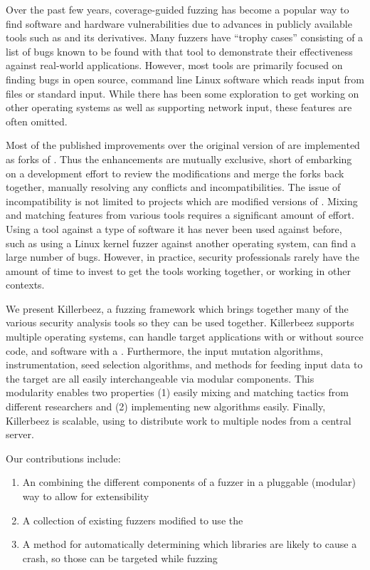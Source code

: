 Over the past few years, coverage-guided fuzzing has become a popular way to
find software and hardware vulnerabilities due to advances in publicly
available tools such as \AFL{}\cite{afl} and its derivatives.\cite{vanhauser} Many
fuzzers have ``trophy cases'' consisting of a list of bugs known to be found with that tool to
demonstrate their effectiveness against real-world applications.  However, most
tools are primarily focused on finding bugs in open source, command line Linux
software which reads input from files or standard input. While there has been some
exploration to get \AFL{} working on other operating
systems\cite{aflosx,winafl} as well as supporting network
input,\cite{netafl,preeny} these features are often omitted.

Most of the published improvements over the original version of \AFL{} are
implemented as forks of
\AFL{}.\cite{aflfast,aflgo,fairfuzz,perffuzz,pythia,collafl}
Thus the enhancements are mutually exclusive, short of embarking on a
development effort to review the modifications and merge the forks back
together, manually resolving any conflicts and incompatibilities.  The issue
of incompatibility is not limited to projects which are modified versions of
\AFL{}. Mixing and matching features from various tools requires a significant
amount of effort. Using a tool against a type of software it has never been
used against before, such as using a Linux kernel fuzzer against another
operating system, can find a large number of bugs\cite{anton}.  However, in practice, security
professionals rarely have the amount of time to invest to get the tools working
together, or working in other contexts.

We present Killerbeez, a fuzzing framework which brings together many of the
various security analysis tools so they can be used together.  Killerbeez
supports multiple operating systems, can handle target applications with or
without source code, and software with a \GUI{}.
Furthermore, the input mutation algorithms, instrumentation, seed selection
algorithms, and methods for feeding input data to the target are all easily
interchangeable via modular components.  This modularity enables two
properties (1) easily mixing and matching
tactics from different researchers and (2) implementing new algorithms easily.
Finally, Killerbeez is scalable, using \BOINC{}\cite{boinc} to distribute work
to multiple nodes from a central server.

Our contributions include:
\begin{enumerate}[noitemsep]
\item An \API{} combining the different components of a fuzzer in a pluggable (modular) way to allow for extensibility
\item A collection of existing fuzzers modified to use the \API{}
\item A method for automatically determining which libraries are likely to
	cause a crash, so those can be targeted while fuzzing
\end{enumerate}
